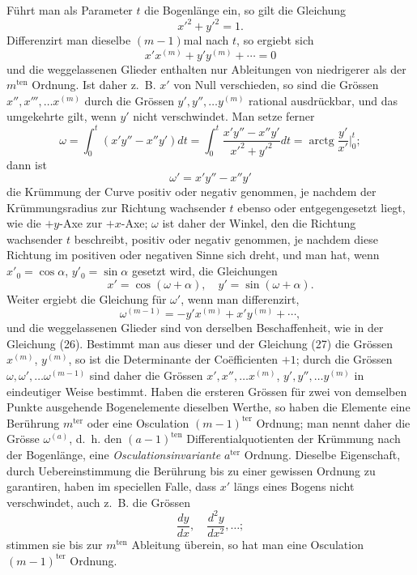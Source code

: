 \documentclass[11pt,a4paper,leqno]{article}
\begin{document}
Führt man als Parameter $t$ die Bogenlänge ein, so gilt die Gleichung
\[
x'^2+y'^2=1.
\]
Differenzirt man dieselbe $(m-1)$mal nach $t$, so ergiebt sich
\begin{equation}\tag{26}
x'x^{(m)}+y'y^{(m)}+\cdots=0
\end{equation}
und die weggelassenen Glieder enthalten nur Ableitungen von niedrigerer als der $m^{\mathrm{ten}}$ Ordnung. Ist daher z.~B. $x'$ von Null verschieden, so sind die Grössen $x'',x''',\ldots x^{(m)}$ durch die Grössen $y',y'',\ldots y^{(m)}$ rational ausdrückbar, und das umgekehrte gilt, wenn $y'$ nicht verschwindet. Man setze ferner
\[
\omega=\int_0^t(x'y''-x''y')dt=\int_0^t\frac{x'y''-x''y'}{x'^2+y'^2}dt=\operatorname{arctg}\frac{y'}{x'}\bigg|_0^t;
\]
dann ist
\[
\omega'=x'y''-x''y'
\]
die Krümmung der Curve positiv oder negativ genommen, je nachdem der Krümmungsradius zur Richtung wachsender $t$ ebenso oder entgegengesetzt liegt, wie die $+y$-Axe zur $+x$-Axe; $\omega$ ist daher der Winkel, den die Richtung wachsender $t$ beschreibt,
positiv oder negativ genommen, je nachdem diese Richtung im positiven oder negativen Sinne sich dreht, und man hat, wenn $x'_0=\cos\alpha$, $y'_0=\sin\alpha$ gesetzt wird, die Gleichungen
\[
x'=\cos(\omega+\alpha),\quad y'=\sin(\omega+\alpha).
\]
Weiter ergiebt die Gleichung für $\omega'$, wenn man differenzirt,
\begin{equation}\tag{27}
\omega^{(m-1)}=-y'x^{(m)}+x'y^{(m)}+\cdots,
\end{equation}
und die weggelassenen Glieder sind von derselben Beschaffenheit, wie in der Gleichung (26). Bestimmt man aus dieser und der Gleichung (27) die Grössen $x^{(m)}$, $y^{(m)}$, so ist die Determinante der Coëfficienten $+1$; durch die Grössen $\omega,\omega',\ldots\omega^{(m-1)}$ sind daher die Grössen $x',x'',\ldots x^{(m)}$, $y',y'',\ldots y^{(m)}$ in eindeutiger Weise bestimmt. Haben die ersteren Grössen für zwei von demselben Punkte ausgehende Bogenelemente dieselben Werthe, so haben die Elemente eine Berührung $m^{\mathrm{ter}}$ oder eine Osculation $(m-1)^{\mathrm{ter}}$ Ordnung; man nennt daher die Grösse $\omega^{(a)}$, d.~h. den $(a-1)^{\mathrm{ten}}$ Differentialquotienten der Krümmung nach der Bogenlänge, eine \emph{Osculationsinvariante} $a^{\mathrm{ter}}$ Ordnung. Dieselbe Eigenschaft, durch Uebereinstimmung die Berührung bis zu einer gewissen Ordnung zu garantiren, haben im speciellen Falle, dass $x'$ längs eines Bogens nicht verschwindet, auch z.~B. die Grössen
\[
\frac{dy}{dx},\quad \frac{d^2y}{dx^2},\ldots;
\]
stimmen sie bis zur $m^{\mathrm{ten}}$ Ableitung überein, so hat man eine Osculation $(m-1)^{\mathrm{ter}}$ Ordnung.
\end{document}
